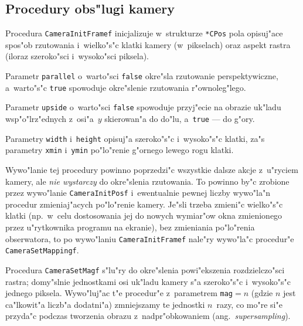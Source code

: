 \subsection{Procedury obs"lugi kamery}

\hspace*{\parindent}Procedura \texttt{CameraInitFramef} inicjalizuje
w~strukturze \texttt{*CPos} pola opisuj"ace spos"ob rzutowania
i~wielko"s"c klatki kamery (w~pikselach) oraz aspekt rastra (iloraz
szeroko"sci i~wysoko"sci piksela).

\begin{sloppypar}
Parametr \texttt{parallel} o~warto"sci \texttt{false} okre"sla rzutowanie
perspektywiczne, a~warto"s"c \texttt{true} spowoduje okre"slenie
rzutowania r"ownoleg"lego.%
\end{sloppypar}

\begin{sloppypar}
Parametr \texttt{upside} o~warto"sci \texttt{false} spowoduje przyj"ecie
na obrazie uk"ladu wsp"o"lrz"ednych z~osi"a~$y$ skierowan"a do do"lu,
a~\texttt{true} --- do g"ory.%
\end{sloppypar}

Parametry \texttt{width} i~\texttt{height} opisuj"a szeroko"s"c
i~wysoko"s"c klatki, za"s parametry \texttt{xmin} i~\texttt{ymin}
po"lo"renie g"ornego lewego rogu klatki.

Wywo"lanie tej procedury powinno poprzedzi"c wszystkie dalsze akcje
z~u"ryciem kamery, ale \emph{nie wystarczy} do okre"slenia rzutowania. To
powinno by"c zrobione przez wywo"lanie \texttt{CameraInitPosf} i~ewentualnie
pewnej liczby wywo"la"n procedur zmieniaj"acych po"lo"renie kamery. Je"sli
trzeba zmieni"c wielko"s"c klatki (np.\ w~celu dostosowania jej do nowych
wymiar"ow okna zmienionego przez u"rytkownika programu na ekranie), bez
zmieniania po"lo"renia obserwatora, to po wywo"laniu
\texttt{CameraInitFramef} nale"ry wywo"la"c procedur"e
\texttt{CameraSetMappingf}.

\vspace{\bigskipamount}
Procedura \texttt{CameraSetMagf} s"lu"ry do okre"slenia powi"ekszenia
rozdzielczo"sci rastra; domy"slnie jednostkami osi uk"ladu kamery s"a
szeroko"s"c i~wysoko"s"c jednego piksela. Wywo"luj"ac t"e procedur"e
z~parametrem \texttt{mag}${}=n$ (gdzie $n$ jest ca"lkowit"a liczb"a dodatni"a)
zmniejszamy te jednostki $n$~razy, co mo"re si"e przyda"c podczas tworzenia
obrazu z~nadpr"obkowaniem (ang.\ \textsl{supersampling}).

